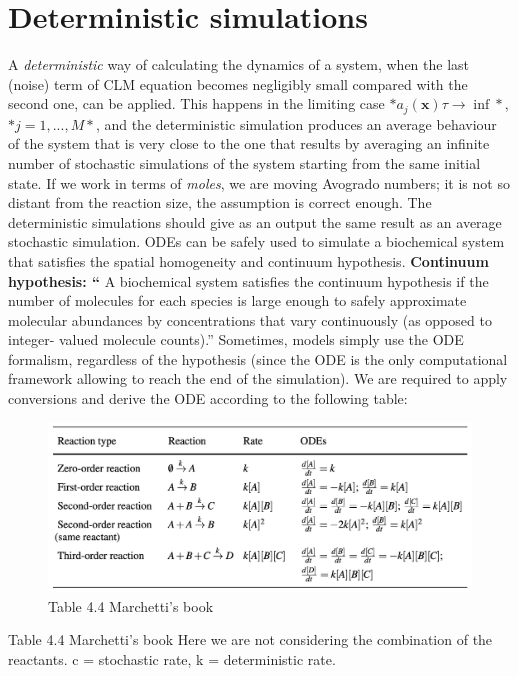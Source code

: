 \graphicspath{{chapters/05/images/}}
\chapter{Deterministic simulations}
A \emph{deterministic} way of calculating the dynamics of a system, when the last (noise) term of CLM equation becomes negligibly small compared with the second one, can be applied.
This happens in the limiting case $*a_j(\mathbf{x})\tau → \inf*$, $*j = 1,...,M*$, and the deterministic simulation produces an average behaviour of the system that is very close to the one that results by averaging an infinite number of stochastic simulations of the system starting from the same initial state.
If we work in terms of \emph{moles}, we are moving Avogrado numbers; it is not so distant from the reaction size, the assumption is correct enough.
The deterministic simulations should give as an output the same result as an average stochastic simulation.
ODEs can be safely used to simulate a biochemical system that satisfies the spatial homogeneity and continuum hypothesis.
\textbf{Continuum hypothesis: ``} A biochemical system satisfies the continuum hypothesis if the number of molecules for each species is large enough to safely approximate molecular abundances by concentrations that vary continuously (as opposed to integer- valued molecule counts).''
Sometimes, models simply use the ODE formalism, regardless of the hypothesis (since the ODE is the only computational framework allowing to reach the end of the simulation).
We are required to apply conversions and derive the ODE according to the following table:

\begin{figure}
  \centering
  \includegraphics[width=\textwidth]{reaction_ODEs.png}
  \caption{Table 4.4 Marchetti's book}
\end{figure}

Table 4.4 Marchetti's book Here we are not considering the combination of the reactants.
c = stochastic rate, k = deterministic rate.

